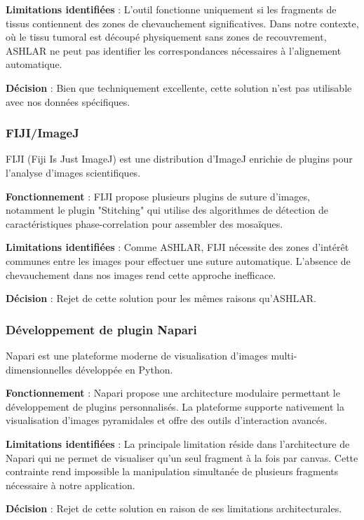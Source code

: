 \documentclass[12pt,a4paper]{report}
\begin{document}
\textbf{Limitations identifiées} : L'outil fonctionne uniquement si les fragments de tissus contiennent des zones de chevauchement significatives. Dans notre contexte, où le tissu tumoral est découpé physiquement sans zones de recouvrement, ASHLAR ne peut pas identifier les correspondances nécessaires à l'alignement automatique.

\textbf{Décision} : Bien que techniquement excellente, cette solution n'est pas utilisable avec nos données spécifiques.

\subsubsection{FIJI/ImageJ}

FIJI (Fiji Is Just ImageJ) est une distribution d'ImageJ enrichie de plugins pour l'analyse d'images scientifiques.

\textbf{Fonctionnement} : FIJI propose plusieurs plugins de suture d'images, notamment le plugin "Stitching" qui utilise des algorithmes de détection de caractéristiques phase-correlation pour assembler des mosaïques.

\textbf{Limitations identifiées} : Comme ASHLAR, FIJI nécessite des zones d'intérêt communes entre les images pour effectuer une suture automatique. L'absence de chevauchement dans nos images rend cette approche inefficace.

\textbf{Décision} : Rejet de cette solution pour les mêmes raisons qu'ASHLAR.

\subsubsection{Développement de plugin Napari}

Napari est une plateforme moderne de visualisation d'images multi-dimensionnelles développée en Python.

\textbf{Fonctionnement} : Napari propose une architecture modulaire permettant le développement de plugins personnalisés. La plateforme supporte nativement la visualisation d'images pyramidales et offre des outils d'interaction avancés.

\textbf{Limitations identifiées} : La principale limitation réside dans l'architecture de Napari qui ne permet de visualiser qu'un seul fragment à la fois par canvas. Cette contrainte rend impossible la manipulation simultanée de plusieurs fragments nécessaire à notre application.

\textbf{Décision} : Rejet de cette solution en raison de ses limitations architecturales.
\end{document}
